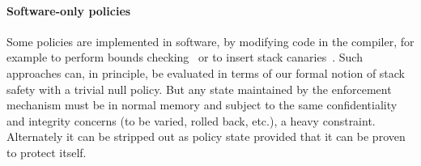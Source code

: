 \documentclass[acmsmall,review,anonymous]{acmart}\settopmatter{printfolios=true,printccs=false,printacmref=false}
\begin{document}

\paragraph*{Software-only policies}
%
Some policies are implemented in software, by modifying code in the
compiler, for example to perform bounds checking~\citep{NagarakatteZMZ09} or
to insert stack canaries~\citep{Cowan+98}. Such approaches can, in principle,
be evaluated in terms of our formal notion of stack safety with a trivial null
policy. But any state maintained by the enforcement mechanism must be in normal
memory and subject to the same confidentiality and integrity concerns (to be
varied, rolled back, etc.), a heavy constraint. Alternately it can be stripped
out as policy state provided that it can be proven to protect itself.



\end{document}
